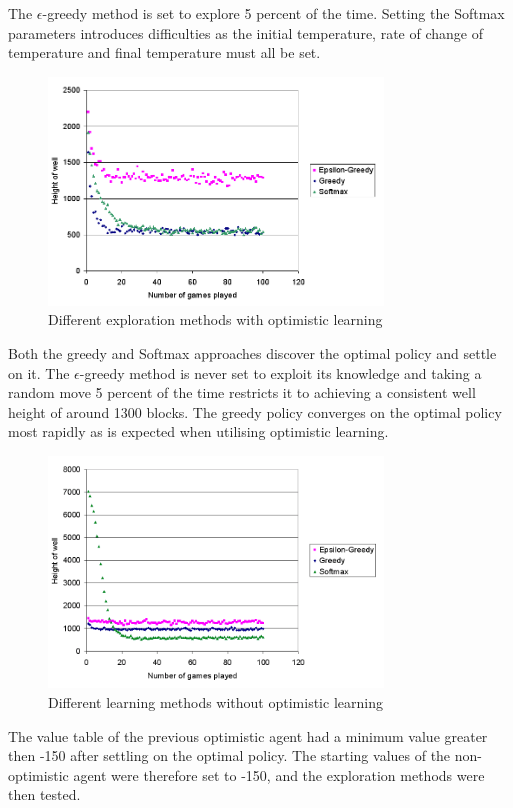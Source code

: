 \documentclass{rucsthesis}
\begin{document}
The $\epsilon$-greedy method is set to explore 5 percent of the time. Setting the Softmax parameters introduces difficulties as the initial temperature, rate of change of temperature and final temperature must all be set.

\begin{figure}[h]
\centering
\includegraphics[width=3.5in]{optomisticexp.png}
\caption{Different exploration methods with optimistic learning}
\label{fig:compexpopt}
\end{figure}

Both the greedy and Softmax approaches discover the optimal policy and settle on it. The $\epsilon$-greedy method is never set to exploit its knowledge and taking a random move 5 percent of the time restricts it to achieving a consistent well height of around 1300 blocks. The greedy policy converges on the optimal policy most rapidly as is expected when utilising optimistic learning.

\begin{figure}[h]
\centering
\includegraphics[width=3.5in]{nonoptomisticexp.png}
\caption{Different learning methods without optimistic learning}
\label{fig:compexp}
\end{figure}

The value table of the previous optimistic agent had a minimum value greater then -150 after settling on the optimal policy. The starting values of the non-optimistic agent were therefore set to -150, and the exploration methods were then tested.
\end{document}
